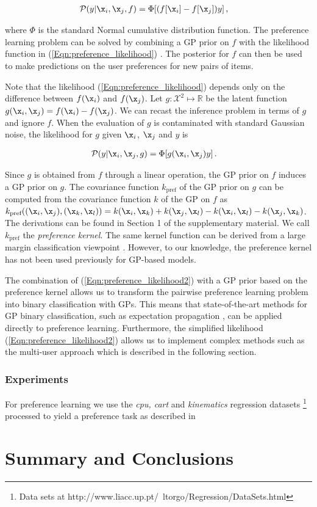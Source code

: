 \begin{align}
\mathcal{P}(y|\x_i,\x_j,f) &= \Phi[(f[\x_i] - f[\x_j])y]\,,\label{Eqn:preference_likelihood}
\end{align}

where $\Phi$ is the standard Normal cumulative distribution function. The preference learning problem can be solved by combining a GP prior on $f$ with the likelihood function in (\ref{Eqn:preference_likelihood}) \citep{Chu2005}. The posterior for $f$ can
then be used to make predictions on the user preferences for new pairs of items.

Note that the likelihood (\ref{Eqn:preference_likelihood}) depends only on the difference between $f(\x_i)$ and $f(\x_j)$.
Let $g:\mathcal{X}^2\mapsto\mathbb{R}$ be the latent function $g(\x_i,\x_j) = f(\x_i) - f(\x_j)$.
We can recast the inference problem in terms of $g$ and ignore $f$. When the evaluation of $g$ is contaminated with standard Gaussian noise, the likelihood for $g$ given $\x_i$, $\x_j$ and $y$ is

\begin{align}
\mathcal{P}(y|\x_i,\x_j,g) &= \Phi[g(\x_i, \x_j)y]\,.\label{Eqn:preference_likelihood2}
\end{align}

Since $g$ is obtained from $f$ through a linear operation, the GP prior on $f$ induces a GP prior on $g$.
The covariance function $k_\text{pref}$ of the GP prior on $g$ can be computed from the covariance function $k$ of the GP on $f$ as $k_\text{pref}((\x_i,\x_j),(\x_k,\x_l)) = k(\x_i,\x_k) + k(\x_j,\x_l) - k(\x_i,\x_l) - k(\x_j,\x_k)$. The derivations can be found in Section 1 of the supplementary material. We call $k_\text{pref}$ the \emph{preference kernel}. The same kernel function can be derived from a large margin classification viewpoint \citep{Furnkranz2010}. However, to our knowledge, the preference kernel has not been used previously for GP-based models.	

The combination of (\ref{Eqn:preference_likelihood2}) with a GP prior based on the preference kernel allows us to transform the pairwise preference learning problem into  binary classification with GPs. This means that state-of-the-art methods for GP binary classification, such as expectation propagation \citep{Minka2001}, can be applied directly to preference learning. Furthermore, the simplified likelihood (\ref{Eqn:preference_likelihood2}) allows us to implement complex methods such as the multi-user approach which is described in the following section.

\subsubsection{Experiments}

For preference learning we use the \emph{cpu, cart} and \emph{kinematics} regression datasets \footnote{Data sets at http://www.liacc.up.pt/~ltorgo/Regression/DataSets.html} processed to yield a preference task as described in \cite{chu2005}

\section{Summary and Conclusions}